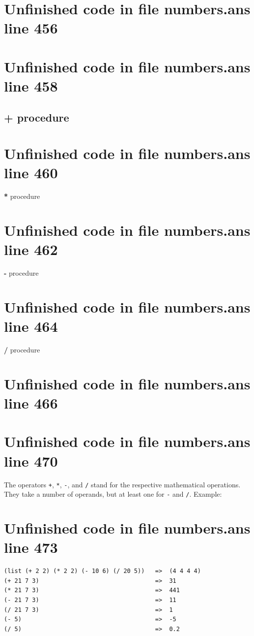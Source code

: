 \documentclass[twoside,9pt]{report}
\begin{document}
\section{Unfinished code in file numbers.ans line 456}
\section{Unfinished code in file numbers.ans line 458}
\subsection{+ procedure}
\label{+-procedure}
\section{Unfinished code in file numbers.ans line 460}

\noindent \textbf{*} procedure

\section{Unfinished code in file numbers.ans line 462}

\noindent \textbf{-} procedure

\section{Unfinished code in file numbers.ans line 464}

\noindent \textbf{/} procedure

\section{Unfinished code in file numbers.ans line 466}

\section{Unfinished code in file numbers.ans line 470}

The operators \texttt{+}, \texttt{*}, \texttt{-}, and \texttt{/} stand for the respective mathematical operations. They take a number of operands, but at least one for \texttt{-} and \texttt{/}. Example:

\section{Unfinished code in file numbers.ans line 473}
\begin{verbatim}
(list (+ 2 2) (* 2 2) (- 10 6) (/ 20 5))   =>  (4 4 4 4)
(+ 21 7 3)                                 =>  31
(* 21 7 3)                                 =>  441
(- 21 7 3)                                 =>  11
(/ 21 7 3)                                 =>  1
(- 5)                                      =>  -5
(/ 5)                                      =>  0.2
\end{verbatim}
\end{document}
